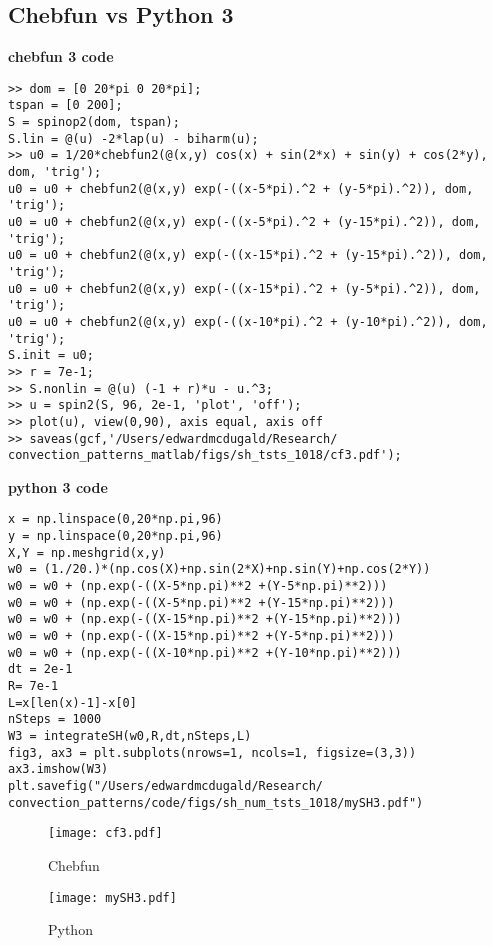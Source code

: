 \documentclass[12pt]{article}
\begin{document}
\subsection{Chebfun vs Python 3}
\textbf{chebfun 3 code}
\begin{verbatim}
>> dom = [0 20*pi 0 20*pi];
tspan = [0 200];
S = spinop2(dom, tspan);
S.lin = @(u) -2*lap(u) - biharm(u);
>> u0 = 1/20*chebfun2(@(x,y) cos(x) + sin(2*x) + sin(y) + cos(2*y), dom, 'trig');
u0 = u0 + chebfun2(@(x,y) exp(-((x-5*pi).^2 + (y-5*pi).^2)), dom, 'trig');
u0 = u0 + chebfun2(@(x,y) exp(-((x-5*pi).^2 + (y-15*pi).^2)), dom, 'trig');
u0 = u0 + chebfun2(@(x,y) exp(-((x-15*pi).^2 + (y-15*pi).^2)), dom, 'trig');
u0 = u0 + chebfun2(@(x,y) exp(-((x-15*pi).^2 + (y-5*pi).^2)), dom, 'trig');
u0 = u0 + chebfun2(@(x,y) exp(-((x-10*pi).^2 + (y-10*pi).^2)), dom, 'trig');
S.init = u0;
>> r = 7e-1;
>> S.nonlin = @(u) (-1 + r)*u - u.^3;
>> u = spin2(S, 96, 2e-1, 'plot', 'off');
>> plot(u), view(0,90), axis equal, axis off
>> saveas(gcf,'/Users/edwardmcdugald/Research/
convection_patterns_matlab/figs/sh_tsts_1018/cf3.pdf');
\end{verbatim}
\textbf{python 3 code}
\begin{verbatim}
x = np.linspace(0,20*np.pi,96)
y = np.linspace(0,20*np.pi,96)
X,Y = np.meshgrid(x,y)
w0 = (1./20.)*(np.cos(X)+np.sin(2*X)+np.sin(Y)+np.cos(2*Y))
w0 = w0 + (np.exp(-((X-5*np.pi)**2 +(Y-5*np.pi)**2)))
w0 = w0 + (np.exp(-((X-5*np.pi)**2 +(Y-15*np.pi)**2)))
w0 = w0 + (np.exp(-((X-15*np.pi)**2 +(Y-15*np.pi)**2)))
w0 = w0 + (np.exp(-((X-15*np.pi)**2 +(Y-5*np.pi)**2)))
w0 = w0 + (np.exp(-((X-10*np.pi)**2 +(Y-10*np.pi)**2)))
dt = 2e-1
R= 7e-1
L=x[len(x)-1]-x[0]
nSteps = 1000
W3 = integrateSH(w0,R,dt,nSteps,L)
fig3, ax3 = plt.subplots(nrows=1, ncols=1, figsize=(3,3))
ax3.imshow(W3)
plt.savefig("/Users/edwardmcdugald/Research/
convection_patterns/code/figs/sh_num_tsts_1018/mySH3.pdf")
\end{verbatim}
\begin{figure}
\centering
\parbox{7cm}{
\texttt{[image: cf3.pdf]}
\caption{Chebfun}
\label{fig:2figsA}}
\qquad
\begin{minipage}{7cm}
\texttt{[image: mySH3.pdf]}
\caption{Python}
\label{fig:2figsB}
\end{minipage}
\end{figure}
\end{document}
